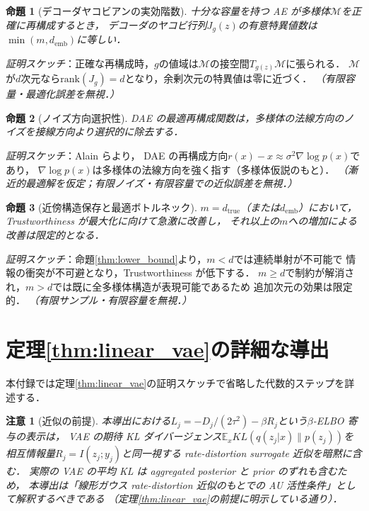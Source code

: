 \documentclass[11pt,a4paper]{jsarticle}
\newtheorem{proposition}{命題}
\newtheorem{remark}{注意}
\newcommand{\dtrue}{d_{\mathrm{true}}}
\newcommand{\Jg}{J_g}
\newcommand{\demb}{d_{\mathrm{emb}}}
\begin{document}
\begin{proposition}[デコーダヤコビアンの実効階数]\label{thm:rank}
十分な容量を持つ AE が多様体$\mathcal{M}$を正確に再構成するとき，
デコーダのヤコビ行列$\Jg(z)$の有意特異値数は$\min(m, \demb)$に等しい．
\end{proposition}
\textit{証明スケッチ}：正確な再構成時，$g$の値域は$\mathcal{M}$の接空間$T_{g(z)}\mathcal{M}$に張られる．
$\mathcal{M}$が$d$次元なら$\mathrm{rank}(\Jg) = d$となり，余剰次元の特異値は零に近づく．
\textit{（有限容量・最適化誤差を無視．）}

\begin{proposition}[ノイズ方向選択性]\label{thm:nsr}
DAE の最適再構成関数は，多様体の法線方向のノイズを接線方向より選択的に除去する．
\end{proposition}
\textit{証明スケッチ}：Alain ら\cite{alain2014dae}より，
DAE の再構成方向$r(x) - x \approx \sigma^2 \nabla\log p(x)$であり，
$\nabla\log p(x)$は多様体の法線方向を強く指す（多様体仮説のもと）．
\textit{（漸近的最適解を仮定；有限ノイズ・有限容量での近似誤差を無視．）}

\begin{proposition}[近傍構造保存と最適ボトルネック]\label{thm:trust}
$m = \dtrue$（または$\demb$）において，Trustworthiness が最大化に向けて急激に改善し，
それ以上の$m$への増加による改善は限定的となる．
\end{proposition}
\textit{証明スケッチ}：命題\ref{thm:lower_bound}より，$m < d$では連続単射が不可能で
情報の衝突が不可避となり，Trustworthiness が低下する．
$m \geq d$で制約が解消され，$m > d$では既に全多様体構造が表現可能であるため
追加次元の効果は限定的．
\textit{（有限サンプル・有限容量を無視．）}

\section{定理\ref{thm:linear_vae}の詳細な導出}\label{app:linear_vae_proof}

本付録では定理\ref{thm:linear_vae}の証明スケッチで省略した代数的ステップを詳述する．

\begin{remark}[近似の前提]
本導出における$L_j = -D_j/(2\tau^2) - \beta R_j$という$\beta$-ELBO 寄与の表示は，
VAE の期待 KL ダイバージェンス$\mathbb{E}_x KL(q(z_j|x)\|p(z_j))$を
相互情報量$R_j = I(z_j; y_j)$と同一視する rate-distortion surrogate 近似を暗黙に含む．
実際の VAE の平均 KL は aggregated posterior と prior のずれも含むため，
本導出は「線形ガウス rate-distortion 近似のもとでの AU 活性条件」として解釈するべきである
（定理\ref{thm:linear_vae}の前提に明示している通り）．
\end{remark}
\end{document}
